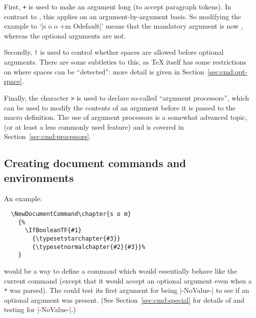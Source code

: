 \documentclass{l3doc}
\begin{document}
First, \texttt{+} is used to make an argument long (to accept paragraph
tokens). In contrast to , this applies on an
argument-by-argument basis. So modifying the example to `|s o o +m O{default}|'
means that the mandatory argument is now , whereas the optional
arguments are not.

Secondly, \texttt{!} is used to control whether spaces are allowed before
optional arguments. There are some subtleties to this, as \TeX{} itself
has some restrictions on where spaces can be \enquote{detected}: more detail
is given in Section~\ref{sec:cmd:opt-space}.

Finally, the character \texttt{>} is used to declare so-called
\enquote{argument processors}, which can be used to modify the contents of an
argument before it is passed to the macro definition. The use of argument
processors is a somewhat advanced topic, (or at least a less commonly used
feature) and is covered in Section~\ref{sec:cmd:processors}.

\subsection{Creating document commands and environments}


An example:
\begin{verbatim}
  \NewDocumentCommand\chapter{s o m}
    {%
      \IfBooleanTF{#1}
        {\typesetstarchapter{#3}}
        {\typesetnormalchapter{#2}{#3}}%
    }
\end{verbatim}
would be a way to define a  command which would essentially behave
like the current \LaTeXe{} command (except that it would accept an optional
argument even when a \texttt{*} was parsed). The 
could test its first argument for being |-NoValue-| to see if an optional
argument was present. (See Section~\ref{sec:cmd:special} for details of
 and testing for |-NoValue-|.)
\end{document}
